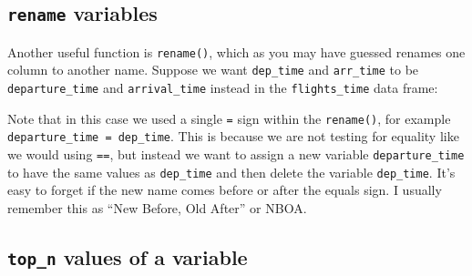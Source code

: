 \documentclass[12pt, krantz2,]{krantz}
\makeatletter
\newenvironment{Shaded}{\begin{snugshade}}{\end{snugshade}}
\newcommand{\DataTypeTok}[1]{\textcolor[rgb]{0.27,0.27,0.27}{#1}}
\newcommand{\KeywordTok}[1]{\textcolor[rgb]{0.27,0.27,0.27}{\textbf{#1}}}
\newcommand{\NormalTok}[1]{#1}
\newcommand{\OperatorTok}[1]{\textcolor[rgb]{0.43,0.43,0.43}{\textbf{#1}}}
\newcommand{\StringTok}[1]{\textcolor[rgb]{0.5,0.5,0.5}{#1}}
\newenvironment{kframe}{%
\medskip{}
\setlength{\fboxsep}{.8em}
 \def\at@end@of@kframe{}%
 \ifinner\ifhmode%
  \def\at@end@of@kframe{\end{minipage}}%
  \begin{minipage}{\columnwidth}%
 \fi\fi%
 \def\FrameCommand##1{\hskip\@totalleftmargin \hskip-\fboxsep
 \colorbox{shadecolor}{##1}\hskip-\fboxsep
     \hskip-\linewidth \hskip-\@totalleftmargin \hskip\columnwidth}%
 \MakeFramed {\advance\hsize-\width
   \@totalleftmargin\z@ \linewidth\hsize
   \@setminipage}}%
 {\par\unskip\endMakeFramed%
 \at@end@of@kframe}
\renewenvironment{Shaded}{\begin{kframe}}{\end{kframe}}
\makeatother
\begin{document}
\begin{Shaded}
\end{Shaded}

\hypertarget{rename}{%
\subsection{\texorpdfstring{\texttt{rename} variables}{rename variables}}\label{rename}}

Another useful function is \texttt{rename()}, which as you may have guessed renames one column to another name. Suppose we want \texttt{dep\_time} and \texttt{arr\_time} to be \texttt{departure\_time} and \texttt{arrival\_time} instead in the \texttt{flights\_time} data frame:

\begin{Shaded}
\end{Shaded}

Note that in this case we used a single \texttt{=} sign within the \texttt{rename()}, for example \texttt{departure\_time\ =\ dep\_time}. This is because we are not testing for equality like we would using \texttt{==}, but instead we want to assign a new variable \texttt{departure\_time} to have the same values as \texttt{dep\_time} and then delete the variable \texttt{dep\_time}. It's easy to forget if the new name comes before or after the equals sign. I usually remember this as ``New Before, Old After'' or NBOA.

\hypertarget{top_n-values-of-a-variable}{%
\subsection{\texorpdfstring{\texttt{top\_n} values of a variable}{top\_n values of a variable}}\label{top_n-values-of-a-variable}}
\end{document}
